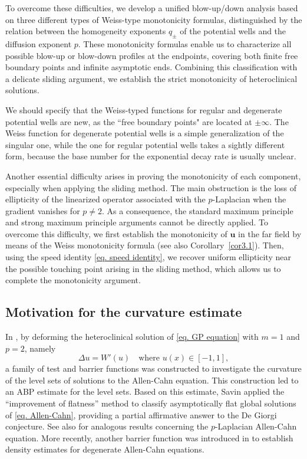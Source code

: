 \documentclass[11pt,twoside,reqno]{amsart}
\numberwithin{equation}{section}
\begin{document}
To overcome these difficulties, we develop a unified blow-up/down analysis based on three different types of Weiss-type monotonicity formulas, distinguished by the relation between the homogeneity exponents $q_{\pm}$ of the potential wells and the diffusion exponent $p$. These monotonicity formulas enable us to characterize all possible blow-up or blow-down profiles at the endpoints, covering both finite free boundary points and infinite asymptotic ends. Combining this classification with a delicate sliding argument, we establish the strict monotonicity of heteroclinical solutions.

We should specify that the Weiss-typed functions for regular and degenerate potential wells are new, as the ``free boundary points" are located at $\pm\infty$. The Weiss function for degenerate potential wells is a simple generalization of the singular one, while the one for regular potential wells takes a sightly different form, because the base number for the exponential decay rate is usually unclear.

Another essential difficulty arises in proving the monotonicity of each component, especially when applying the sliding method. The main obstruction is the loss of ellipticity of the linearized operator associated with the $p$-Laplacian when the gradient vanishes for $p\neq 2$. As a consequence, the standard maximum principle and strong maximum principle arguments cannot be directly applied. To overcome this difficulty, we first establish the monotonicity of $\mathbf{u}$ in the far field by means of the Weiss monotonicity formula (see also Corollary~\ref{cor3.1}). Then, using the speed identity \eqref{eq. speed identity}, we recover uniform ellipticity near the possible touching point arising in the sliding method, which allows us to complete the monotonicity argument.

\subsection{Motivation for the curvature estimate}
In \cite{S09}, by deforming the heteroclinical solution of \eqref{eq. GP equation} with $m=1$ and $p=2$, namely
\begin{equation}\label{eq. Allen-Cahn}
    \Delta u=W'(u)\quad\mbox{where }u(x)\in[-1,1],
\end{equation}
a family of test and barrier functions was constructed to investigate the curvature of the level sets of solutions to the Allen-Cahn equation. This construction led to an ABP estimate for the level sets. Based on this estimate, Savin applied the ``improvement of flatness'' method to classify asymptotically flat global solutions of \eqref{eq. Allen-Cahn}, providing a partial affirmative answer to the De Giorgi conjecture. See also \cite{SV05,VSS06} for analogous results concerning the $p$-Laplacian Allen-Cahn equation. More recently, another barrier function was introduced in \cite{SZ26} to establish density estimates for degenerate Allen-Cahn equations.
\end{document}
